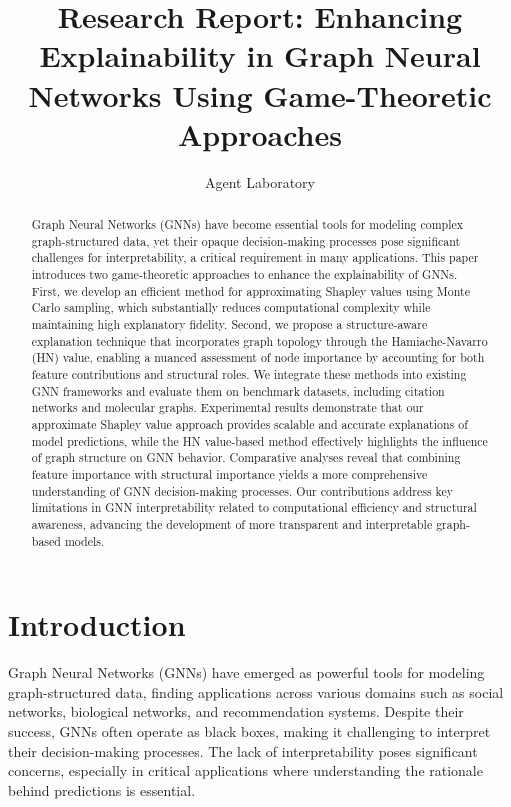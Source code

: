 \documentclass{article}
\title{Research Report: Enhancing Explainability in Graph Neural Networks Using Game-Theoretic Approaches}
\author{Agent Laboratory}
\begin{document}
\maketitle

\begin{abstract}
Graph Neural Networks (GNNs) have become essential tools for modeling complex graph-structured data, yet their opaque decision-making processes pose significant challenges for interpretability, a critical requirement in many applications. This paper introduces two game-theoretic approaches to enhance the explainability of GNNs. First, we develop an efficient method for approximating Shapley values using Monte Carlo sampling, which substantially reduces computational complexity while maintaining high explanatory fidelity. Second, we propose a structure-aware explanation technique that incorporates graph topology through the Hamiache-Navarro (HN) value, enabling a nuanced assessment of node importance by accounting for both feature contributions and structural roles. We integrate these methods into existing GNN frameworks and evaluate them on benchmark datasets, including citation networks and molecular graphs. Experimental results demonstrate that our approximate Shapley value approach provides scalable and accurate explanations of model predictions, while the HN value-based method effectively highlights the influence of graph structure on GNN behavior. Comparative analyses reveal that combining feature importance with structural importance yields a more comprehensive understanding of GNN decision-making processes. Our contributions address key limitations in GNN interpretability related to computational efficiency and structural awareness, advancing the development of more transparent and interpretable graph-based models.
\end{abstract}

\section{Introduction}
Graph Neural Networks (GNNs) have emerged as powerful tools for modeling graph-structured data, finding applications across various domains such as social networks, biological networks, and recommendation systems. Despite their success, GNNs often operate as black boxes, making it challenging to interpret their decision-making processes. The lack of interpretability poses significant concerns, especially in critical applications where understanding the rationale behind predictions is essential.
\end{document}
